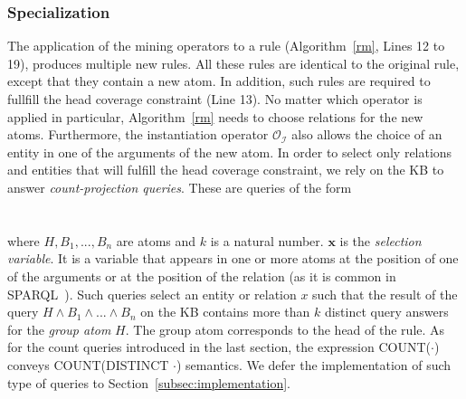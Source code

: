 \subsubsection{Specialization}
\label{subsubsec:specialization}

The application of the mining operators to a rule (Algorithm~\ref{rm}, Lines 12 to 19), produces multiple new rules. 
All these rules are identical to the original rule, except that they contain
a new atom. In addition, such rules are required to fullfill the head coverage constraint (Line 13). No matter which operator is applied in particular, Algorithm~\ref{rm} needs to choose relations
for the new atoms. Furthermore, the instantiation operator $\mathcal{O_I}$ also allows the choice of an entity in one 
of the arguments of the new atom.
In order to select only relations and entities that will fulfill the head coverage constraint, 
we rely on the KB to answer \emph{count-projection queries}.
These are queries of the form \\ \\
 \\

\noindent where $H, B_1, ..., B_n$ are atoms and $k$ is a natural number.
$\bm{x}$ is the \emph{selection variable}.
It is a variable that appears in one or more atoms at the position of one of the arguments or at the position of the relation (as it is common in SPARQL~\cite{sparql}). 
Such queries select an entity or relation $x$ such that the result of the query $H \wedge B_1 \wedge ... \wedge B_n$ on the KB contains more than $k$ distinct query answers
for the \emph{group atom} $H$. The group atom corresponds to the head of the rule. As for the count queries introduced
in the last section, the expression COUNT($\cdot$) conveys COUNT(DISTINCT $\cdot$) semantics.
We defer the implementation of such type of queries to Section~\ref{subsec:implementation}.


